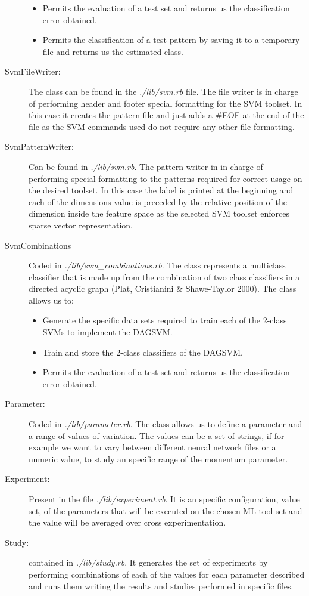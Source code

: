 \documentclass[a4paper,10pt,titlepage]{article}
\begin{document}
\begin{description}
\begin{itemize}
		\item Permits the evaluation of a test set and returns us the classification error obtained.
		\item Permits the classification of a test pattern by saving it to a temporary file and returns us the estimated class.
	\end{itemize}
	\item[SvmFileWriter:] The class can be found in the \textit{./lib/svm.rb} file. The file writer is in charge of performing header and footer special formatting for the SVM toolset. In this case it creates the pattern file and just adds a \#EOF at the end of the file as the SVM commands used do not require any other file formatting.
	\item[SvmPatternWriter:] Can be found in \textit{./lib/svm.rb}. The pattern writer in in charge of performing special formatting to the patterns required for correct usage on the desired toolset. In this case the label is printed at the beginning and each of the dimensions value is preceded by the relative position of the dimension inside the feature space as the selected SVM toolset enforces sparse vector representation.
	\item[SvmCombinations] Coded in \textit{./lib/svm\_combinations.rb}. The class represents a multiclass classifier that is made up from the combination of two class classifiers in a directed acyclic graph (Plat, Cristianini \& Shawe-Taylor 2000). The class allows us to:
	\begin{itemize}
		\item Generate the specific data sets required to train each of the 2-class SVMs to implement the DAGSVM.
		\item Train and store the 2-class classifiers of the DAGSVM.
		\item Permits the evaluation of a test set and returns us the classification error obtained.
	\end{itemize}
	
	\item[Parameter:] Coded in \textit{./lib/parameter.rb}. The class allows us to define a parameter and a range of values of variation. The values can be a set of strings, if for example we want to vary between different neural network files or a numeric value, to study an specific range of the momentum parameter. 
	\item[Experiment:] Present in the file \textit{./lib/experiment.rb}. It is an specific configuration, value set, of the parameters that will be executed on the chosen ML tool set and the value will be averaged over cross experimentation. 
	\item[Study:] contained in \textit{./lib/study.rb}. It generates the set of experiments by performing combinations of each of the values for each parameter described and runs them writing the results and studies performed in specific files. 
\end{description}
\end{document}
